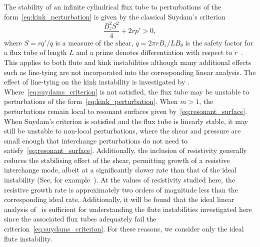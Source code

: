 \documentclass[fleqn,usenatbib]{mnras}
\newcommand{\rev}[1]{{\color{red} {#1}}}
\newcommand{\revcite}[1]{{\color{red} \underline{#1}}}
\begin{document}
The stability of an infinite cylindrical flux tube to perturbations of the
form~\eqref{eq:kink_perturbation} is given by the classical Suydam's
criterion~\citep{suydamStabilityLinearPinch1958}
\begin{equation}
  \label{eq:suydams_criterion}
\frac{B_z^2 S^2}{4} + 2 r p' > 0,
\end{equation}
where $S = r q'/q$ is a measure of the shear, $q = 2\pi r B_z / L B_{\theta}$
is the safety factor for a flux tube of length $L$ and a prime denotes
differentiation with respect to
$r$~\citep{mikhailovskiiInstabilitiesConfinedPlasma1998}. This applies to both
flute and kink instabilities although many additional effects such as
line-tying are not incorporated into the corresponding linear analysis. The
effect of line-tying on the kink instability is investigated
by \revcite{\citet{hoodKinkInstabilitySolar1979}}. Where~\eqref{eq:suydams_criterion} is
not satisfied, the flux tube may be unstable to perturbations of the
form~\eqref{eq:kink_perturbation}. When $m>1$, the perturbations remain local
to resonant surfaces given by~\eqref{eq:resonant_surface}. When Suydam's
criterion is satisfied and the flux tube is linearly stable, it may still be
unstable to non-local perturbations, where the shear and pressure are small
enough that interchange perturbations do not need to
satisfy~\eqref{eq:resonant_surface}. Additionally, the inclusion of resistivity
generally reduces the stabilising effect of the shear, permitting growth of
a resistive interchange mode, albeit at a significantly slower rate than that of the ideal
instability (See, for example~\citet{mikhailovskiiInstabilitiesConfinedPlasma1998}). \rev{At the values of resistivity studied here, the resistive growth rate is approximately two orders of magnitude less than the corresponding ideal rate.} Additionally, it will be
found that the ideal linear analysis
of~\cite{mikhailovskiiInstabilitiesConfinedPlasma1998} is sufficient for
understanding the flute instabilities investigated here since the associated
flux tubes adequately fail the criterion~\eqref{eq:suydams_criterion}. For these reasons, we consider only the ideal flute instability.
\end{document}
